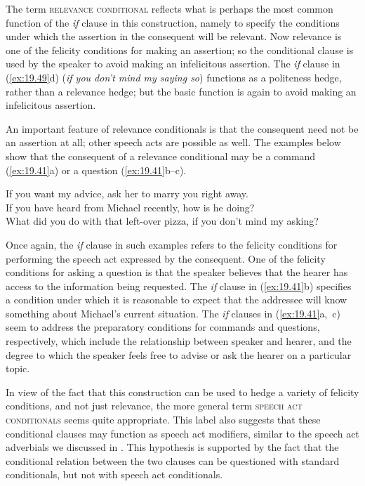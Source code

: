 The term \textsc{relevance conditional} reflects what is perhaps the most common function of the \textit{if} clause in this construction, namely to specify the conditions under which the assertion in the consequent will be relevant. Now relevance is one of the felicity conditions for making an assertion; so the conditional clause is used by the speaker to avoid making an infelicitous assertion. The \textit{if} clause in (\ref{ex:19.49}d) (\textit{if you don’t mind my saying so}) functions as a politeness hedge, rather than a relevance hedge; but the basic function is again to avoid making an infelicitous assertion.



An important feature of relevance conditionals is that the consequent need not be an assertion at all; other speech acts are possible as well. The examples below show that the consequent of a relevance conditional may be a command (\ref{ex:19.41}a) or a question (\ref{ex:19.41}b--c). 


\ea \label{ex:19.41}
\ea  If you want my advice, ask her to marry you right away.\\
\ex If you have heard from Michael recently, how is he doing?\\
\ex What did you do with that left-over pizza, if you don’t mind my asking?
                       \z
\z


Once again, the \textit{if} clause in such examples refers to the felicity conditions for performing the speech act expressed by the consequent. One of the felicity conditions for asking a question is that the speaker believes that the hearer has access to the information being requested. The \textit{if} clause in (\ref{ex:19.41}b) specifies a condition under which it is reasonable to expect that the addressee will know something about Michael’s current situation. The \textit{if} clauses in (\ref{ex:19.41}a,~c) seem to address the preparatory conditions for commands and questions, respectively, which include the relationship between speaker and hearer, and the degree to which the speaker feels free to advise or ask the hearer on a particular topic.



In view of the fact that this construction can be used to hedge a variety of felicity conditions, and not just relevance, the more general term \textsc{speech act conditionals} seems quite appropriate. This label also suggests that these conditional clauses may function as speech act modifiers, similar to the speech act adverbials we discussed in . This hypothesis is supported by the fact that the conditional relation between the two clauses can be questioned with standard conditionals, but not with speech act conditionals.



